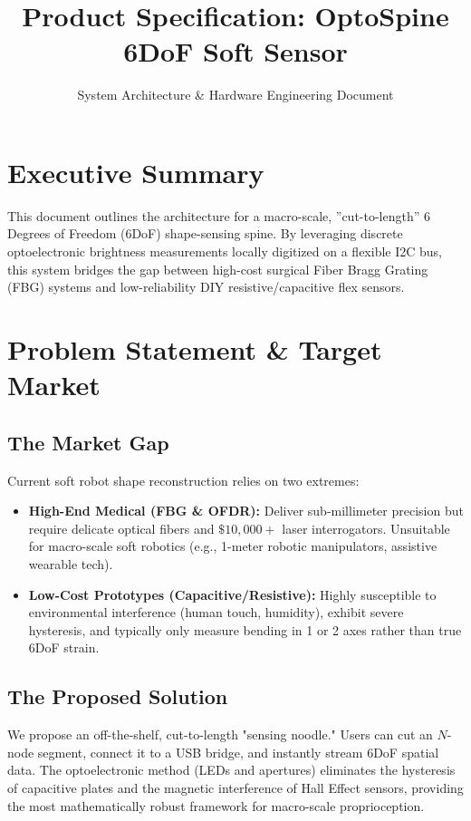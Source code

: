 \documentclass[11pt]{article}
\title{\textbf{Product Specification: OptoSpine 6DoF Soft Sensor}}
\author{System Architecture \& Hardware Engineering Document}
\date{}
\begin{document}
\maketitle

\section{Executive Summary}
This document outlines the architecture for a macro-scale, ''cut-to-length'' 6 Degrees of Freedom (6DoF) shape-sensing spine. By leveraging discrete optoelectronic brightness measurements locally digitized on a flexible I2C bus, this system bridges the gap between high-cost surgical Fiber Bragg Grating (FBG) systems and low-reliability DIY resistive/capacitive flex sensors.

\section{Problem Statement \& Target Market}
\subsection{The Market Gap}
Current soft robot shape reconstruction relies on two extremes:
\begin{itemize}
    \item \textbf{High-End Medical (FBG \& OFDR):} Deliver sub-millimeter precision but require delicate optical fibers and $\$10,000+$ laser interrogators. Unsuitable for macro-scale soft robotics (e.g., 1-meter robotic manipulators, assistive wearable tech).
    \item \textbf{Low-Cost Prototypes (Capacitive/Resistive):} Highly susceptible to environmental interference (human touch, humidity), exhibit severe hysteresis, and typically only measure bending in 1 or 2 axes rather than true 6DoF strain.
\end{itemize}

\subsection{The Proposed Solution}
We propose an off-the-shelf, cut-to-length "sensing noodle." Users can cut an $N$-node segment, connect it to a USB bridge, and instantly stream 6DoF spatial data. The optoelectronic method (LEDs and apertures) eliminates the hysteresis of capacitive plates and the magnetic interference of Hall Effect sensors, providing the most mathematically robust framework for macro-scale proprioception.
\end{document}
